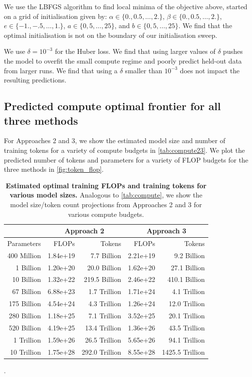 \documentclass[11pt, a4paper, logo, copyright, nonumbering]{deepmind}
\begin{document}
We use the LBFGS algorithm to find local minima of the objective above, started on a grid of initialisation given by: $\alpha \in \{0., 0.5,\dots, 2. \}$, $\beta \in \{ 0., 0.5,\dots, 2.\}$, $e \in \{-1., -.5, \dots, 1. \}$, $a \in \{0, 5, \dots, 25 \}$, and $b \in \{0, 5, \dots, 25 \}$.
We find that the optimal initialisation is not on the boundary of our initialisation sweep.

We use $\delta = 10^{-3}$ for the Huber loss. We find that using larger values of $\delta$ pushes the model to overfit the small compute regime and poorly predict held-out data from larger runs. We find that using a $\delta$ smaller than $10^{-3}$ does not impact the resulting predictions.

\subsection{Predicted compute optimal frontier for all three methods} \label{app:estimated_flops_and_tokens_2_and3}
For Approaches 2 and 3, we show the estimated model size and number of training tokens for a variety of compute budgets in \autoref{tab:compute23}. We plot the predicted number of tokens and parameters for a variety of FLOP budgets for the three methods in \autoref{fig:token_flop}.
\begin{table}[h!]
    \centering
    \begin{tabular}{r | rr | rr}
    \toprule
    & \multicolumn{2}{c}{Approach 2}& \multicolumn{2}{c}{Approach 3} \\
    \midrule
    Parameters & FLOPs & 
     Tokens &  FLOPs & 
     Tokens \\
    \midrule
    400 Million & 1.84e+19 & 7.7 Billion & 2.21e+19 & 9.2 Billion \\
    1 Billion & 1.20e+20 & 20.0 Billion & 1.62e+20 & 27.1 Billion \\
    10 Billion & 1.32e+22 & 219.5 Billion & 2.46e+22 & 410.1 Billion \\
    67 Billion & 6.88e+23  & 1.7 Trillion & 1.71e+24  & 4.1 Trillion \\
    175 Billion & 4.54e+24 & 4.3 Trillion & 1.26e+24 & 12.0 Trillion \\
    280 Billion & 1.18e+25  & 7.1 Trillion & 3.52e+25  & 20.1 Trillion \\
    520 Billion & 4.19e+25 & 13.4 Trillion & 1.36e+26 & 43.5 Trillion \\
    1 Trillion & 1.59e+26 & 26.5 Trillion & 5.65e+26 & 94.1 Trillion \\
    10 Trillion & 1.75e+28 & 292.0 Trillion & 8.55e+28 & 1425.5 Trillion \\
    \bottomrule
    \end{tabular}
    \caption{\textbf{Estimated optimal training FLOPs and training tokens for various model sizes.}
    Analogous to \autoref{tab:compute}, we show the model size/token count projections from Approaches 2 and 3 for various compute budgets.}.
    \label{tab:compute23}
\end{table}
\end{document}
